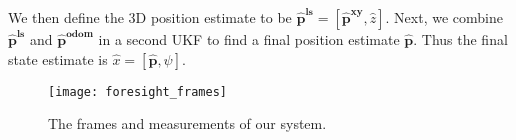 %

We then define the 3D position estimate to be $\bm{\hat{p}^{ls}} = [\bm{\hat{p}^{xy}}, \hat{z}]$. Next, we combine $\bm{\hat{p}^{ls}}$ and $\bm{\hat{p}^{\text{odom}}}$ in a second UKF to find a final position estimate $\bm{\hat{p}}$. Thus the final state estimate is $\hat{x} = [\bm{\hat{p}}, \psi]$.


\begin{figure}[tb!]
  \centering
    \texttt{[image: foresight\_frames]}
  \caption{The frames and measurements of our system.}
  \label{fig:frames}
\end{figure}







